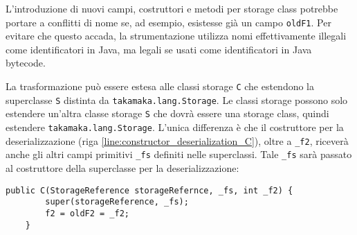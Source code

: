 L'introduzione di nuovi campi, costruttori e metodi per storage class potrebbe portare a conflitti di nome se, ad esempio, esistesse già un campo \lstinline|oldF1|. Per evitare che questo accada, la strumentazione utilizza nomi effettivamente illegali come identificatori in Java, ma legali se usati come identificatori in Java bytecode.

La trasformazione può essere estesa alle classi storage \lstinline|C| che estendono la superclasse \lstinline|S| distinta da \lstinline|takamaka.lang.Storage|. Le classi storage possono solo estendere un'altra classe storage \lstinline|S| che dovrà essere una storage class, quindi estendere \lstinline|takamaka.lang.Storage|. L'unica differenza è che il costruttore per la deserializzazione (riga \ref{line:constructor_deserialization_C}), oltre a \lstinline|_f2|, riceverà anche gli altri campi primitivi \lstinline|_fs| definiti nelle superclassi. Tale \lstinline|_fs| sarà passato al costruttore della superclasse per la deserializzazione:
%
\begin{lstlisting}[numbers=none,frame=none]
	public C(StorageReference storageRefernce, _fs, int _f2) {
		super(storageReference, _fs);
		f2 = oldF2 = _f2;
	}
\end{lstlisting}
%
